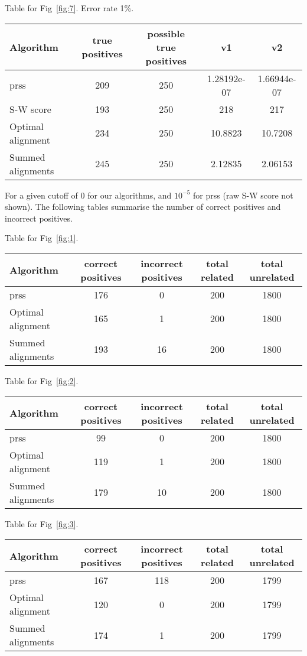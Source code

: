 \documentclass[a4paper,10pt,oneside]{article}
\begin{document}
Table for Fig~\ref{fig:7}. Error rate 1\%.
\begin{tabular}{|l|c|c|c|c|} \hline
Algorithm & true positives & possible true positives & v1 & v2 \\ \hline
prss & 209 & 250 & 1.28192e-07 & 1.66944e-07 \\
S-W score & 193 & 250 & 218 & 217 \\
Optimal alignment & 234 & 250 & 10.8823 & 10.7208 \\
Summed alignments & 245 & 250 & 2.12835 & 2.06153 \\\hline
\end{tabular}





For a given cutoff of 0 for our algorithms, and $10^{-5}$ for prss (raw S-W
score not shown).  The following tables summarise the number of correct
positives and incorrect positives.

Table for Fig~\ref{fig:1}.
\begin{tabular}{|l||c|c|c|c|} \hline
Algorithm & correct positives & incorrect positives & total related & total unrelated \\ \hline
prss & 176 & 0 & 200 & 1800 \\ 
Optimal alignment & 165 & 1 & 200 & 1800 \\ 
Summed alignments & 193 & 16 & 200 & 1800 \\ 
\hline \end{tabular}

Table for Fig~\ref{fig:2}.
\begin{tabular}{|l||c|c|c|c|} \hline
Algorithm & correct positives & incorrect positives & total related & total unrelated \\ \hline
prss & 99 & 0 & 200 & 1800 \\ 
Optimal alignment & 119 & 1 & 200 & 1800 \\ 
Summed alignments & 179 & 10 & 200 & 1800 \\ 
\hline \end{tabular}

Table for Fig~\ref{fig:3}.
\begin{tabular}{|l||c|c|c|c|} \hline
Algorithm & correct positives & incorrect positives & total related & total unrelated \\ \hline
prss & 167 & 118 & 200 & 1799 \\ 
Optimal alignment & 120 & 0 & 200 & 1799 \\ 
Summed alignments & 174 & 1 & 200 & 1799 \\ 
\hline \end{tabular}
\end{document}
